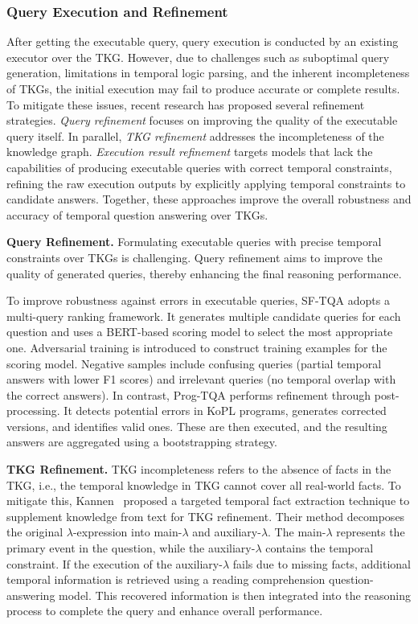 {\subsubsection{Query Execution and Refinement}
After getting the executable query, query execution is conducted by an existing executor over the TKG. However, due to challenges such as suboptimal query generation, limitations in temporal logic parsing, and the inherent incompleteness of TKGs, the initial execution may fail to produce accurate or complete results.
To mitigate these issues, recent research has proposed several refinement strategies. \textit{Query refinement} focuses on improving the quality of the executable query itself. In parallel, \textit{TKG refinement} addresses the incompleteness of the knowledge graph. \textit{Execution result refinement} targets models that lack the capabilities of producing executable queries with correct temporal constraints, refining the raw execution outputs by explicitly applying temporal constraints to candidate answers. Together, these approaches improve the overall robustness and accuracy of temporal question answering over TKGs.


\textbf{Query Refinement.}
Formulating executable queries with precise temporal constraints over TKGs is challenging. Query refinement aims to improve the quality of generated queries, thereby enhancing the final reasoning performance.

To improve robustness against errors in executable queries, SF-TQA adopts a multi-query ranking framework. It generates multiple candidate queries for each question and uses a BERT-based scoring model to select the most appropriate one. Adversarial training is introduced to construct training examples for the scoring model. Negative samples include confusing queries (partial temporal answers with lower F1 scores) and irrelevant queries (no temporal overlap with the correct answers).
In contrast, Prog-TQA performs refinement through post-processing. It detects potential errors in KoPL programs, generates corrected versions, and identifies valid ones. These are then executed, and the resulting answers are aggregated using a bootstrapping strategy.

\textbf{TKG Refinement.}
TKG incompleteness refers to the absence of facts in the TKG, i.e., the temporal knowledge in TKG cannot cover all real-world facts. To mitigate this, Kannen~\cite{kannenBestBothWorlds2023} proposed a targeted temporal fact extraction technique to supplement knowledge from text for TKG refinement. Their method decomposes the original $\lambda$-expression into main-$\lambda$ and auxiliary-$\lambda$. The main-$\lambda$ represents the primary event in the question, while the auxiliary-$\lambda$ contains the temporal constraint. If the execution of the auxiliary-$\lambda$ fails due to missing facts, additional temporal information is retrieved using a reading comprehension question-answering model. This recovered information is then integrated into the reasoning process to complete the query and enhance overall performance.

}
